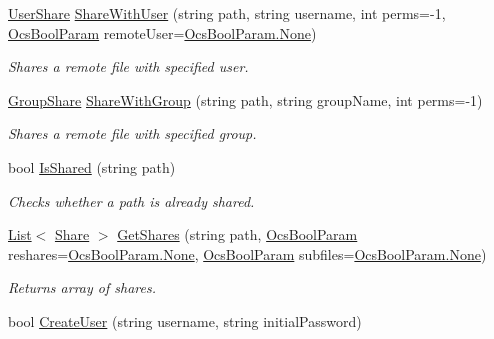 \begin{DoxyCompactItemize}
\hyperlink{classowncloudsharp_1_1_types_1_1_user_share}{User\+Share} \hyperlink{classowncloudsharp_1_1_client_a69d7df9c2e91b8716bb0c5a2f5ff7878}{Share\+With\+User} (string path, string username, int perms=-\/1, \hyperlink{namespaceowncloudsharp_a7d494b18f174086318df1bdf916068b5}{Ocs\+Bool\+Param} remote\+User=\hyperlink{namespaceowncloudsharp_a86ba7b86b85c7f5be2304a1ef7ae3157a6adf97f83acf6453d4a6a4b1070f3754}{Ocs\+Bool\+Param.\+None})
\begin{DoxyCompactList}\small\item\em Shares a remote file with specified user. \end{DoxyCompactList}\item 
\hyperlink{classowncloudsharp_1_1_types_1_1_group_share}{Group\+Share} \hyperlink{classowncloudsharp_1_1_client_a22625407b475bd43c292fc80fbcebad9}{Share\+With\+Group} (string path, string group\+Name, int perms=-\/1)
\begin{DoxyCompactList}\small\item\em Shares a remote file with specified group. \end{DoxyCompactList}\item 
bool \hyperlink{classowncloudsharp_1_1_client_a241b88019805ddd87e8d596a6cf6c7a9}{Is\+Shared} (string path)
\begin{DoxyCompactList}\small\item\em Checks whether a path is already shared. \end{DoxyCompactList}\item 
\hyperlink{classowncloudsharp_1_1_client_a914c144ebbe207958829523f7eda3609}{List}$<$ \hyperlink{classowncloudsharp_1_1_types_1_1_share}{Share} $>$ \hyperlink{classowncloudsharp_1_1_client_acd8b3359561282563c774b6e4784cb3d}{Get\+Shares} (string path, \hyperlink{namespaceowncloudsharp_a7d494b18f174086318df1bdf916068b5}{Ocs\+Bool\+Param} reshares=\hyperlink{namespaceowncloudsharp_a86ba7b86b85c7f5be2304a1ef7ae3157a6adf97f83acf6453d4a6a4b1070f3754}{Ocs\+Bool\+Param.\+None}, \hyperlink{namespaceowncloudsharp_a7d494b18f174086318df1bdf916068b5}{Ocs\+Bool\+Param} subfiles=\hyperlink{namespaceowncloudsharp_a86ba7b86b85c7f5be2304a1ef7ae3157a6adf97f83acf6453d4a6a4b1070f3754}{Ocs\+Bool\+Param.\+None})
\begin{DoxyCompactList}\small\item\em Returns array of shares. \end{DoxyCompactList}\item 
bool \hyperlink{classowncloudsharp_1_1_client_a7e285455e3f0cf437d9359956b6feaa5}{Create\+User} (string username, string initial\+Password)

\end{DoxyCompactItemize}
